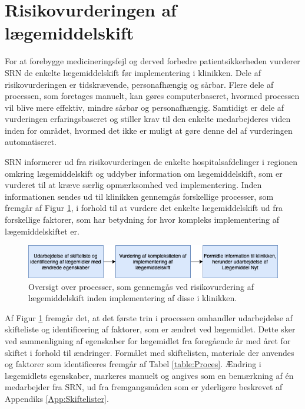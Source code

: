 \section{Risikovurderingen af lægemiddelskift} \label{sec:ImpLaeg}
For at forebygge medicineringsfejl og derved forbedre patientsikkerheden vurderer SRN de enkelte lægemiddelskift før implementering i klinikken. Dele af risikovurderingen er tidskrævende, personafhængig og sårbar. Flere dele af processen, som foretages manuelt, kan gøres computerbaseret, hvormed processen vil blive mere effektiv, mindre sårbar og personafhængig. Samtidigt er dele af vurderingen erfaringsbaseret og stiller krav til den enkelte medarbejderes viden inden for området, hvormed det ikke er muligt at gøre denne del af vurderingen automatiseret.

SRN informerer ud fra risikovurderingen de enkelte hospitalsafdelinger i regionen omkring lægemiddelskift og uddyber information om lægemiddelskift, som er vurderet til at kræve særlig opmærksomhed ved implementering. Inden informationen sendes ud til klinikken gennemgås forskellige processer, som fremgår af Figur \ref{fig:Proces}, i forhold til at vurdere det enkelte lægemiddelskift ud fra forskellige faktorer, som har betydning for hvor kompleks implementering af lægemiddelskiftet er. 

\begin{figure}[H]\centering	\includegraphics[width=1\textwidth]{billeder/proces.png} 
	\caption{Oversigt over processer, som gennemgås ved risikovurdering af lægemiddelskift inden implementering af disse i klinikken.}\label{fig:Proces}  
\end{figure}

Af Figur \ref{fig:Proces} fremgår det, at det første trin i processen omhandler udarbejdelse af skifteliste og identificering af faktorer, som er ændret ved lægemidlet. Dette sker ved sammenligning af egenskaber for lægemidlet fra foregående år med året for skiftet i forhold til ændringer. Formålet med skiftelisten, materiale der anvendes og faktorer som identificeres fremgår af Tabel \ref{table:Proces}. Ændring i lægemidlets egenskaber, markeres manuelt og angives som en bemærkning af én medarbejder fra SRN, ud fra fremgangsmåden som er yderligere beskrevet af Appendiks \ref{App:Skiftelister}.

